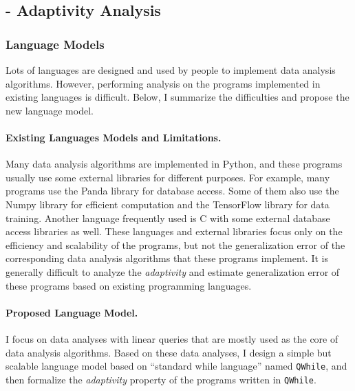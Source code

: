 \subsection{ - Adaptivity Analysis}
\label{sec:intro-methodology-adapt}

\subsubsection{Language Models}
\label{sec:intro-methodology-adapt-language}
Lots of languages are designed and used by people to implement data analysis algorithms.
However, performing analysis on the programs implemented in existing languages is difficult. Below, I summarize the difficulties
and propose the new language model.
\paragraph{Existing Languages Models and Limitations.}
Many data analysis algorithms are implemented in Python, and
these programs usually use some external libraries for different purposes.
For example, many programs use the Panda library for database access.
Some of them also use the Numpy library for efficient computation and the TensorFlow library for data training.
Another language frequently used is C with some external database access libraries as well.
These languages and external libraries
focus only on the efficiency and scalability of the programs, but not
the generalization error of the corresponding data analysis algorithms that these programs implement.
It is generally difficult to analyze the \emph{adaptivity} and
estimate generalization error of these programs
 based on existing programming languages.

\paragraph{Proposed Language Model.}
I focus on data analyses with linear queries that are mostly used as the core of data analysis algorithms.
Based on these data analyses, I design a simple but scalable language model based on ``standard while language'' named {\tt QWhile},
and then formalize
the \emph{adaptivity} property of the programs written in {\tt QWhile}. 


